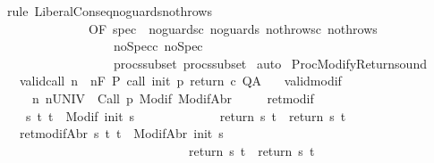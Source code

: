 \begin{isabellebody}
\isamarkupfalse%
\ {\isacharparenleft}rule\ LiberalConseq{\isacharunderscore}noguards{\isacharunderscore}nothrows\isanewline
\ \ \ \ \ \ \ \ \ \ \ \ \ \ {\isacharbrackleft}OF\ spec\ {\isacharunderscore}\ noguards{\isacharunderscore}c\ noguards{\isacharunderscore}{\isasymGamma}\ nothrows{\isacharunderscore}c\ nothrows{\isacharunderscore}{\isasymGamma}\isanewline
\ \ \ \ \ \ \ \ \ \ \ \ \ \ \ \ \ \ noSpec{\isacharunderscore}c\ noSpec{\isacharunderscore}{\isasymGamma}\ \isanewline
\ \ \ \ \ \ \ \ \ \ \ \ \ \ \ \ \ \ procs{\isacharunderscore}subset\ procs{\isacharunderscore}subset{\isacharunderscore}{\isasymGamma}{\isacharbrackright}{\isacharparenright}\isanewline
{}\isamarkupfalse%
\ auto\isanewline
{}\isamarkupfalse%
%
\endisatagproof
{\isafoldproof}%
%
\isadelimproof
%
\endisadelimproof
%
\isamarkuptrue%
\isamarkupfalse%
\ ProcModifyReturn{\isacharunderscore}sound{\isacharcolon}\isanewline
\ \ \ valid{\isacharunderscore}call{\isacharcolon}\ {\isachardoublequoteopen}{\isasymforall}n{\isachardot}\ {\isasymGamma}{\isacharcomma}{\isasymTheta}\ {\isasymTurnstile}n{\isacharcolon}\isactrlbsub {\isacharslash}F\isactrlesub \ P\ call\ init\ p\ return{\isacharprime}\ c\ Q{\isacharcomma}A{\isachardoublequoteclose}\isanewline
\ \ \ valid{\isacharunderscore}modif{\isacharcolon}\ \isanewline
\ \ \ \ {\isachardoublequoteopen}{\isasymforall}{\isasymsigma}{\isachardot}\ {\isasymforall}n{\isachardot}\ {\isasymGamma}{\isacharcomma}{\isasymTheta}{\isasymTurnstile}n{\isacharcolon}\isactrlbsub {\isacharslash}UNIV\isactrlesub \ {\isacharbraceleft}{\isasymsigma}{\isacharbraceright}\ Call\ p\ {\isacharparenleft}Modif\ {\isasymsigma}{\isacharparenright}{\isacharcomma}{\isacharparenleft}ModifAbr\ {\isasymsigma}{\isacharparenright}{\isachardoublequoteclose}\ \isanewline
\ \ \ ret{\isacharunderscore}modif{\isacharcolon}\isanewline
\ \ \ \ {\isachardoublequoteopen}{\isasymforall}s\ t{\isachardot}\ t\ {\isasymin}\ Modif\ {\isacharparenleft}init\ s{\isacharparenright}\ \isanewline
\ \ \ \ \ \ \ \ \ \ \ {\isasymlongrightarrow}\ return{\isacharprime}\ s\ t\ {\isacharequal}\ return\ s\ t{\isachardoublequoteclose}\isanewline
\ \ \ ret{\isacharunderscore}modifAbr{\isacharcolon}\ {\isachardoublequoteopen}{\isasymforall}s\ t{\isachardot}\ t\ {\isasymin}\ ModifAbr\ {\isacharparenleft}init\ s{\isacharparenright}\ \isanewline
\ \ \ \ \ \ \ \ \ \ \ \ \ \ \ \ \ \ \ \ \ \ \ \ \ \ \ \ \ {\isasymlongrightarrow}\ return{\isacharprime}\ s\ t\ {\isacharequal}\ return\ s\ t{\isachardoublequoteclose}\isanewline

\end{isabellebody}
